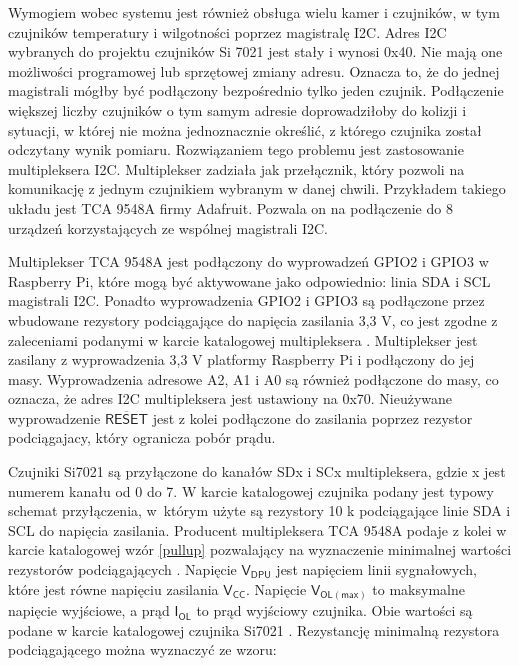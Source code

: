 \documentclass[a4paper,11pt,twoside]{article}
\begin{document}
Wymogiem wobec systemu jest również obsługa wielu kamer i czujników, w tym czujników temperatury i wilgotności poprzez magistralę I2C. Adres I2C wybranych do projektu czujników Si 7021 jest stały i wynosi 0x40. Nie mają one możliwości programowej lub sprzętowej zmiany adresu. Oznacza to, że do jednej magistrali mógłby być podłączony bezpośrednio tylko jeden czujnik. Podłączenie większej liczby czujników o tym samym adresie doprowadziłoby do kolizji i sytuacji, w której nie można jednoznacznie określić, z którego czujnika został odczytany wynik pomiaru. Rozwiązaniem tego problemu jest zastosowanie multipleksera I2C. Multiplekser zadziała jak przełącznik, który pozwoli na komunikację z jednym czujnikiem wybranym w danej chwili. Przykładem takiego układu jest TCA 9548A firmy Adafruit. Pozwala on na podłączenie do 8 urządzeń korzystających ze wspólnej magistrali I2C.

Multiplekser TCA 9548A jest podłączony do wyprowadzeń GPIO2 i GPIO3 w Raspberry Pi, które mogą być aktywowane jako odpowiednio: linia SDA i SCL magistrali I2C. Ponadto wyprowadzenia GPIO2 i GPIO3 są podłączone przez wbudowane rezystory podciągające do napięcia zasilania 3,3 V\cite{rpi_schematic}, co jest zgodne z zaleceniami podanymi w karcie katalogowej multipleksera \cite{multiplekser}. Multiplekser jest zasilany z wyprowadzenia 3,3 V platformy Raspberry Pi i podłączony do jej masy. Wyprowadzenia adresowe A2, A1 i A0 są również podłączone do masy, co oznacza, że adres I2C multipleksera jest ustawiony na 0x70. Nieużywane wyprowadzenie $\overline{\mathsf{RESET}}$ jest z kolei podłączone do zasilania poprzez rezystor podciągajacy, który ogranicza pobór prądu.

Czujniki Si7021 są przyłączone do kanałów SDx i SCx multipleksera, gdzie x jest numerem kanału od 0 do 7. W karcie katalogowej czujnika podany jest typowy schemat przyłączenia, w~którym użyte są rezystory 10 k\textOmega\hspace{0.2em} podciągające  linie SDA i SCL do napięcia zasilania. Producent multipleksera TCA 9548A podaje z kolei w karcie katalogowej wzór \ref{pullup} pozwalający na wyznaczenie minimalnej wartości rezystorów podciągających \cite{multiplekser}. Napięcie $\mathsf{V_{DPU}}$ jest napięciem linii sygnałowych, które jest równe napięciu zasilania $\mathsf{V_{CC}}$. Napięcie $\mathsf{V_{OL(max)}}$ to maksymalne napięcie wyjściowe, a prąd $\mathsf{I_{OL}}$ to prąd wyjściowy czujnika. Obie wartości są podane w karcie katalogowej czujnika Si7021 \cite{czujnik_temp}. Rezystancję minimalną rezystora podciągającego można wyznaczyć ze wzoru:
\end{document}
